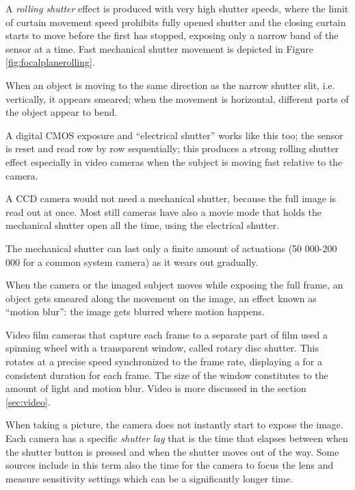 A \emph{rolling shutter} effect is produced with very high shutter speeds, where the limit of curtain movement speed prohibits fully opened shutter and the closing curtain starts to move before the first has stopped, exposing only a narrow band of the sensor at a time.
Fast mechanical shutter movement is depicted in Figure \ref{fig:focalplanerolling}.

When an object is moving to the same direction as the narrow shutter slit, i.e. vertically, it appears smeared;
when the movement is horizontal, different parts of the object appear to bend.


A digital CMOS exposure and ``electrical shutter'' works like this too; the sensor is reset and read row by row sequentially; this produces a strong rolling shutter effect especially in video cameras when the subject is moving fast relative to the camera.

A CCD camera would not need a mechanical shutter, because the full image is read out at once.
Most still cameras have also a movie mode that holds the mechanical shutter open all the time, using the electrical shutter.

The mechanical shutter can last only a finite amount of actuations (50 000-200 000 for a common system camera) as it wears out gradually.


When the camera or the imaged subject moves while exposing the full frame, an object gets smeared along the movement on the image, an effect known as ``motion blur'': the image gets blurred where motion happens.

Video film cameras that capture each frame to a separate part of film used a spinning wheel with a transparent window, called rotary disc shutter. \cite{wilson2004anton}
This rotates at a precise speed synchronized to the frame rate, displaying a for a consistent duration for each frame.
The size of the window constitutes to the amount of light and motion blur.
Video is more discussed in the section \ref{sec:video}.

When taking a picture, the camera does not instantly start to expose the image.
Each camera has a specific \emph{shutter lag} that is the time that elapses between when the shutter button is pressed and when the shutter moves out of the way.
Some sources include in this term also the time for the camera to focus the lens and measure sensitivity settings which can be a significantly longer time.

